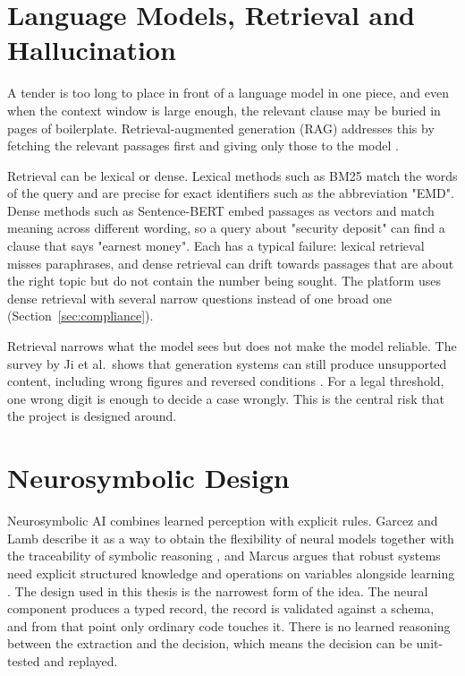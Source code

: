 \section{Language Models, Retrieval and Hallucination}
A tender is too long to place in front of a language model in one piece, and even when the context window is large enough, the relevant clause may be buried in pages of boilerplate. Retrieval-augmented generation (RAG) addresses this by fetching the relevant passages first and giving only those to the model \cite{lewis2020retrieval}.

Retrieval can be lexical or dense. Lexical methods such as BM25 \cite{robertson2009probabilistic} match the words of the query and are precise for exact identifiers such as the abbreviation "EMD". Dense methods such as Sentence-BERT \cite{reimers2019sentence} embed passages as vectors and match meaning across different wording, so a query about "security deposit" can find a clause that says "earnest money". Each has a typical failure: lexical retrieval misses paraphrases, and dense retrieval can drift towards passages that are about the right topic but do not contain the number being sought. The platform uses dense retrieval with several narrow questions instead of one broad one (Section~\ref{sec:compliance}).

Retrieval narrows what the model sees but does not make the model reliable. The survey by Ji et al.\ shows that generation systems can still produce unsupported content, including wrong figures and reversed conditions \cite{ji2023survey}. For a legal threshold, one wrong digit is enough to decide a case wrongly. This is the central risk that the project is designed around.

\section{Neurosymbolic Design}
Neurosymbolic AI combines learned perception with explicit rules. Garcez and Lamb describe it as a way to obtain the flexibility of neural models together with the traceability of symbolic reasoning \cite{garcez2023neurosymbolic}, and Marcus argues that robust systems need explicit structured knowledge and operations on variables alongside learning \cite{marcus2020next}. The design used in this thesis is the narrowest form of the idea. The neural component produces a typed record, the record is validated against a schema, and from that point only ordinary code touches it. There is no learned reasoning between the extraction and the decision, which means the decision can be unit-tested and replayed.

